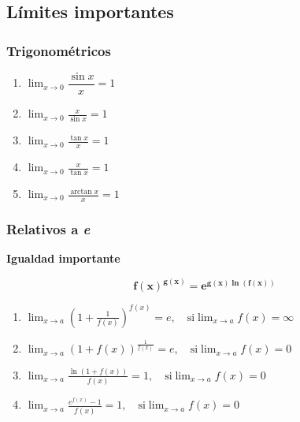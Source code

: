 \documentclass[11pt,titlepage]{article}
\newcommand{\commLim}[2]{\lim_{#1 \to #2}}
\newcommand{\displayLim}[2]{\displaystyle \commLim{#1}{#2}}
\newcommand{\littleTitle}[1]{
	\noindent \ignorespaces
	\small \textbf{#1} \normalsize
	\ignorespaces \ignorespacesafterend
}
\begin{document}
\subsection{Límites importantes}
\subsubsection{Trigonométricos}
\begin{multicols}{3}
	\begin{enumerate}[label=\alph*.]
		\item $ \displayLim{x}{0} \dfrac{\sin x}{x} = 1 $
		\item $ \displayLim{x}{0} \frac{x}{\sin x} = 1 $
		\item $ \displayLim{x}{0} \frac{\tan x}{x} = 1 $
		\item $ \displayLim{x}{0} \frac{x}{\tan x} = 1 $
		\item $ \displayLim{x}{0} \frac{\arctan x}{x} = 1 $
	\end{enumerate}
\end{multicols}

\subsubsection{Relativos a \textit{e}}
\littleTitle{Igualdad importante}\par
	\begin{equation}
		\boldsymbol{f(x)^{g(x)} = e^{g(x) \ln(f(x))}}
	\end{equation}

\begin{enumerate}[label=\alph*.]
	\item $ \displayLim{x}{a} \left(1+\frac{1}{f(x)}\right)^{f(x)} = e, \quad	\text{si} \commLim{x}{a} f(x) = \infty $
	\item $ \displayLim{x}{a} (1+f(x))^{\frac{1}{f(x)}} = e, \quad	\text{si} \commLim{x}{a} f(x) = 0 $
	\item $ \displayLim{x}{a} \frac{\ln(1 + f(x))}{f(x)} = 1, \quad	\text{si} \commLim{x}{a} f(x) = 0 $
	\item $ \displayLim{x}{a} \frac{e^{f(x)}-1}{f(x)} = 1, \quad \text{si} \commLim{x}{a} f(x) = 0 $
\end{enumerate}
\end{document}

